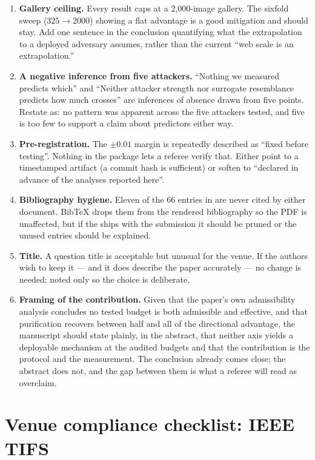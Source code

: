 \documentclass[11pt,a4paper]{article}
\newcommand{\file}[1]{\path{#1}}
\begin{document}
\begin{enumerate}
\item \textbf{Gallery ceiling.} Every result caps at a 2{,}000-image gallery.
  The sixfold sweep ($325\to2000$) showing a flat advantage is a good mitigation
  and should stay. Add one sentence in the conclusion quantifying what the
  extrapolation to a deployed adversary assumes, rather than the current
  ``web scale is an extrapolation.''
\item \textbf{A negative inference from five attackers.} ``Nothing we measured
  predicts which'' and ``Neither attacker strength nor surrogate resemblance
  predicts how much crosses'' are inferences of absence drawn from five points.
  Restate as: no pattern was apparent across the five attackers tested, and five
  is too few to support a claim about predictors either way.
\item \textbf{Pre-registration.} The $\pm0.01$ margin is repeatedly described as
  ``fixed before testing''. Nothing in the package lets a referee verify that.
  Either point to a timestamped artifact (a commit hash is sufficient) or
  soften to ``declared in advance of the analyses reported here''.
\item \textbf{Bibliography hygiene.} Eleven of the 66 entries in
  \file{ref.bib} are never cited by either document. BibTeX drops them from the
  rendered bibliography so the PDF is unaffected, but if the \file{.bib} ships
  with the submission it should be pruned or the unused entries should be
  explained.
\item \textbf{Title.} A question title is acceptable but unusual for the venue.
  If the authors wish to keep it --- and it does describe the paper accurately
  --- no change is needed; noted only so the choice is deliberate.
\item \textbf{Framing of the contribution.} Given that the paper's own
  admissibility analysis concludes no tested budget is both admissible and
  effective, and that purification recovers between half and all of the
  directional advantage, the manuscript should state plainly, in the abstract,
  that neither axis yields a deployable mechanism at the audited budgets and
  that the contribution is the protocol and the measurement. The conclusion
  already comes close; the abstract does not, and the gap between them is what
  a referee will read as overclaim.
\end{enumerate}

\section{Venue compliance checklist: IEEE TIFS}
\label{sec:venue}
\end{document}
